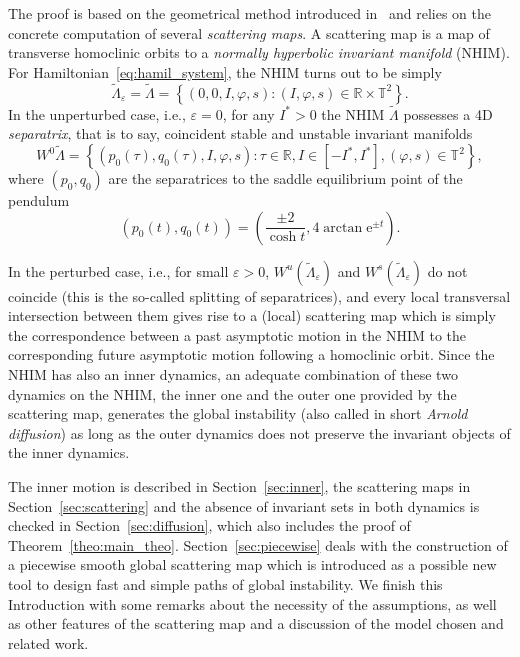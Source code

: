\documentclass[a4paper,10pt]{article}
\theoremstyle{definition}
\begin{document}
The proof is based on the geometrical method introduced in~\cite{Seara2006} and relies on
the concrete computation of several \emph{scattering maps}. A scattering map is a map
of transverse homoclinic orbits to a \emph{normally hyperbolic invariant manifold} (NHIM).
For Hamiltonian~\eqref{eq:hamil_system}, the NHIM turns out to be simply
\begin{equation}
\tilde{\Lambda}_{\varepsilon}=\tilde{\Lambda} = \left\{( 0 , 0 , I , \varphi , s ) : ( I , \varphi , s ) \in \mathbb{R}\times \mathbb{T}^2\right\}.\label{eq:NHIM_manifold}
\end{equation}
In the unperturbed case, i.e., $\varepsilon = 0$, for any $I^* >0$ the NHIM $\tilde{\Lambda}$ possesses a 4D \emph{separatrix},
that is to say, coincident stable and unstable invariant manifolds
\begin{equation*}
W^0\tilde{\Lambda} = \left\{ ( p_0( \tau ) , q_0( \tau ) , I , \varphi , s ) : \tau\in\mathbb{R} , I\in\left[-I^* , I^* \right] , ( \varphi , s ) \in \mathbb{T}^2 \right\},
\end{equation*}
where $( p_0, q_0)$ are the separatrices to the saddle equilibrium point of the pendulum
\begin{equation*}
\left(p_0(t) , q_0(t)\right) = \left(\frac{\pm 2}{\cosh t} , 4 \arctan\textrm{e}^{ \pm t}\right).
\end{equation*}

In the perturbed case, i.e., for small $\varepsilon > 0 $, $W^u(\tilde{\Lambda}_{\varepsilon})$
and $W^s(\tilde{\Lambda}_{\varepsilon})$ do not coincide (this is the so-called
splitting of separatrices), and every local transversal intersection between them gives
rise to a (local) scattering map which is simply the correspondence between a
past asymptotic motion in the NHIM to the corresponding future asymptotic motion following a homoclinic orbit.
Since the NHIM has also an inner dynamics, an adequate combination of these two dynamics on the NHIM, the inner one and the outer one provided by the scattering map, generates the global instability (also called in short \emph{Arnold diffusion}) as long as the outer dynamics does not preserve the invariant objects of the inner dynamics. 

The inner motion is described in Section~\ref{sec:inner}, the scattering maps in Section~\ref{sec:scattering} and the absence of
invariant sets in both dynamics is checked in Section~\ref{sec:diffusion},
which also includes the proof of Theorem~\ref{theo:main_theo}.
Section~\ref{sec:piecewise} deals with the construction of a piecewise smooth global scattering map
which is introduced as a possible new tool to design fast and simple paths of global instability.
We finish this Introduction with some remarks
about the necessity of the assumptions, as well as other features of the scattering map and
a discussion of the model chosen and related work.
\end{document}
